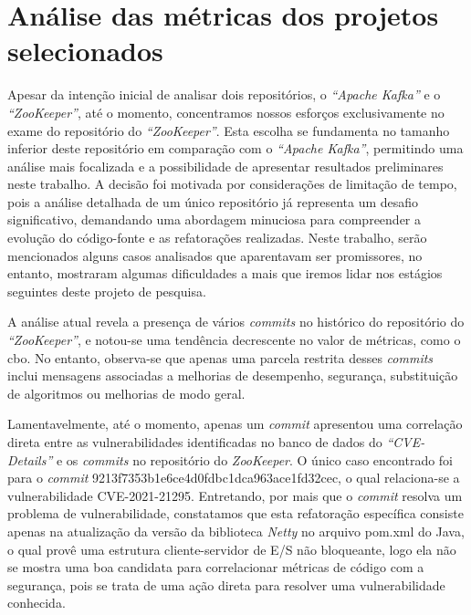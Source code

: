 \section{Análise das métricas dos projetos selecionados}
Apesar da intenção inicial de analisar dois repositórios, o \textit{``Apache Kafka''} e o \textit{``ZooKeeper''}, até o momento, concentramos nossos esforços exclusivamente no exame do repositório do \textit{``ZooKeeper''}. Esta escolha se fundamenta no tamanho inferior deste repositório em comparação com o \textit{``Apache Kafka''}, permitindo uma análise mais focalizada e a possibilidade de apresentar resultados preliminares neste trabalho. A decisão foi motivada por considerações de limitação de tempo, pois a análise detalhada de um único repositório já representa um desafio significativo, demandando uma abordagem minuciosa para compreender a evolução do código-fonte e as refatorações realizadas.  Neste trabalho, serão mencionados alguns casos analisados que aparentavam ser promissores, no entanto, mostraram algumas dificuldades a mais que iremos lidar nos estágios seguintes deste projeto de pesquisa.

A análise atual revela a presença de vários \textit{commits} no histórico do repositório do \textit{``ZooKeeper''}, e notou-se uma tendência decrescente no valor de métricas, como o \gls{cbo}. No entanto, observa-se que apenas uma parcela restrita desses \textit{commits} inclui mensagens associadas a melhorias de desempenho, segurança, substituição de algoritmos ou melhorias de modo geral. 


Lamentavelmente, até o momento, apenas um \textit{commit} apresentou uma correlação direta entre as vulnerabilidades identificadas no banco de dados do \textit{``CVE-Details''} e os \textit{commits} no repositório do \textit{ZooKeeper}. O único caso encontrado foi para o \textit{commit} 9213f7353b1e6ce4d0fdbc1dca963ace1fd32cec, o qual relaciona-se a vulnerabilidade CVE-2021-21295. Entretando, por mais que o \textit{commit} resolva um problema de vulnerabilidade, constatamos que esta refatoração específica consiste apenas na atualização da versão da biblioteca \textit{Netty} no arquivo pom.xml do Java, o qual provê uma estrutura cliente-servidor de E/S não bloqueante, logo ela não se mostra uma boa candidata para correlacionar métricas de código com a segurança, pois se trata de uma ação direta para resolver uma vulnerabilidade conhecida.

